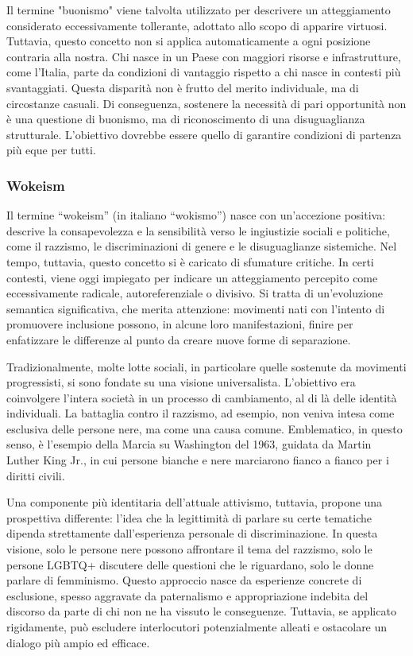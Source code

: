 \documentclass[12pt]{book} %
\begin{document}
\begin{mdframed}[linewidth=1pt]
Il termine "buonismo" viene talvolta utilizzato per descrivere un atteggiamento considerato eccessivamente tollerante, adottato allo scopo di apparire virtuosi. Tuttavia, questo concetto non si applica automaticamente a ogni posizione contraria alla nostra. Chi nasce in un Paese con maggiori risorse e infrastrutture, come l’Italia, parte da condizioni di vantaggio rispetto a chi nasce in contesti più svantaggiati. Questa disparità non è frutto del merito individuale, ma di circostanze casuali. Di conseguenza, sostenere la necessità di pari opportunità non è una questione di buonismo, ma di riconoscimento di una disuguaglianza strutturale. L’obiettivo dovrebbe essere quello di garantire condizioni di partenza più eque per tutti.
\end{mdframed}

\subsubsection{Wokeism}
Il termine “wokeism” (in italiano “wokismo”) nasce con un’accezione positiva: descrive la consapevolezza e la sensibilità verso le ingiustizie sociali e politiche, come il razzismo, le discriminazioni di genere e le disuguaglianze sistemiche. Nel tempo, tuttavia, questo concetto si è caricato di sfumature critiche. In certi contesti, viene oggi impiegato per indicare un atteggiamento percepito come eccessivamente radicale, autoreferenziale o divisivo. Si tratta di un’evoluzione semantica significativa, che merita attenzione: movimenti nati con l’intento di promuovere inclusione possono, in alcune loro manifestazioni, finire per enfatizzare le differenze al punto da creare nuove forme di separazione.

Tradizionalmente, molte lotte sociali, in particolare quelle sostenute da movimenti progressisti, si sono fondate su una visione universalista. L’obiettivo era coinvolgere l’intera società in un processo di cambiamento, al di là delle identità individuali. La battaglia contro il razzismo, ad esempio, non veniva intesa come esclusiva delle persone nere, ma come una causa comune. Emblematico, in questo senso, è l’esempio della Marcia su Washington del 1963, guidata da Martin Luther King Jr., in cui persone bianche e nere marciarono fianco a fianco per i diritti civili.

Una componente più identitaria dell’attuale attivismo, tuttavia, propone una prospettiva differente: l’idea che la legittimità di parlare su certe tematiche dipenda strettamente dall’esperienza personale di discriminazione. In questa visione, solo le persone nere possono affrontare il tema del razzismo, solo le persone LGBTQ+ discutere delle questioni che le riguardano, solo le donne parlare di femminismo. Questo approccio nasce da esperienze concrete di esclusione, spesso aggravate da paternalismo e appropriazione indebita del discorso da parte di chi non ne ha vissuto le conseguenze. Tuttavia, se applicato rigidamente, può escludere interlocutori potenzialmente alleati e ostacolare un dialogo più ampio ed efficace.
\end{document}
